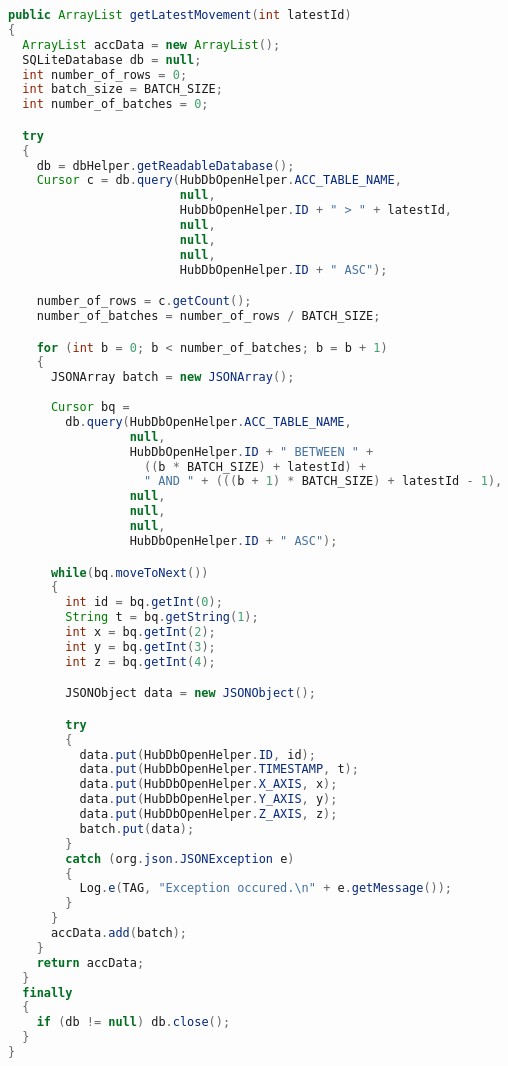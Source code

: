 \documentclass[11pt, a4paper, oneside, english]{scrbook}
\begin{document}
\begin{lstlisting}[language=Java, numbers=none]
public ArrayList getLatestMovement(int latestId)
{
  ArrayList accData = new ArrayList();
  SQLiteDatabase db = null;
  int number_of_rows = 0;
  int batch_size = BATCH_SIZE;
  int number_of_batches = 0;

  try
  {
    db = dbHelper.getReadableDatabase();
    Cursor c = db.query(HubDbOpenHelper.ACC_TABLE_NAME,
                        null,
                        HubDbOpenHelper.ID + " > " + latestId,
                        null,
                        null,
                        null,
                        HubDbOpenHelper.ID + " ASC");

    number_of_rows = c.getCount();
    number_of_batches = number_of_rows / BATCH_SIZE;

    for (int b = 0; b < number_of_batches; b = b + 1)
    {
      JSONArray batch = new JSONArray();
        
      Cursor bq = 
        db.query(HubDbOpenHelper.ACC_TABLE_NAME,
                 null,
                 HubDbOpenHelper.ID + " BETWEEN " + 
                   ((b * BATCH_SIZE) + latestId) + 
                   " AND " + (((b + 1) * BATCH_SIZE) + latestId - 1),
                 null,
                 null,
                 null,
                 HubDbOpenHelper.ID + " ASC");

      while(bq.moveToNext())
      {
        int id = bq.getInt(0);
        String t = bq.getString(1);
        int x = bq.getInt(2);
        int y = bq.getInt(3);
        int z = bq.getInt(4);

        JSONObject data = new JSONObject();

        try
        {
          data.put(HubDbOpenHelper.ID, id);
          data.put(HubDbOpenHelper.TIMESTAMP, t);
          data.put(HubDbOpenHelper.X_AXIS, x);
          data.put(HubDbOpenHelper.Y_AXIS, y);
          data.put(HubDbOpenHelper.Z_AXIS, z);
          batch.put(data);
        }
        catch (org.json.JSONException e)
        {
          Log.e(TAG, "Exception occured.\n" + e.getMessage());
        }
      }
      accData.add(batch);
    }
    return accData;
  }
  finally
  {
    if (db != null) db.close();
  }
}
\end{lstlisting}
\end{document}
